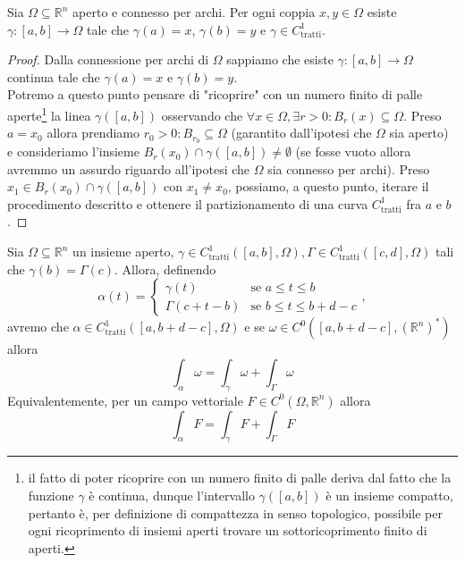 \begin{lemma}
	Sia $\Omega \subseteq \mathbb{R}^n$ aperto e connesso per archi. Per ogni coppia $x, y \in \Omega$ esiste $\gamma:[a, b] \to \Omega$ tale che $\gamma(a) = x$, $\gamma(b)=y$ e $\gamma \in C^1_\text{tratti}$.
\end{lemma}
\begin{proof}
	Dalla connessione per archi di $\Omega$ sappiamo che esiste $\gamma: [a, b] \to \Omega$ continua tale che $\gamma(a) = x$ e $\gamma(b) = y$. \\
	Potremo a questo punto pensare di "ricoprire" con un numero finito di palle aperte\footnote{il fatto di poter ricoprire con un numero finito di palle deriva dal fatto che la funzione $\gamma$ è continua, dunque l'intervallo $\gamma([a, b])$ è un insieme compatto, pertanto è, per definizione di compattezza in senso topologico, possibile per ogni ricoprimento di insiemi aperti trovare un sottoricoprimento finito di aperti.} la linea $\gamma([a, b])$ osservando che $\forall x \in \Omega, \exists r > 0: B_r(x) \subseteq \Omega$. Preso $a = x_0$ allora prendiamo $r_0 > 0: B_{r_0} \subseteq \Omega$ (garantito dall'ipotesi che $\Omega$ sia aperto) e consideriamo l'insieme
	$B_r(x_0) \cap \gamma([a, b]) \neq \emptyset$ (se fosse vuoto allora avremmo un assurdo riguardo all'ipotesi che $\Omega$ sia connesso per archi). Preso $x_1 \in B_r(x_0) \cap \gamma([a, b])$ con $x_1 \neq x_0$, possiamo, a questo punto, iterare il procedimento descritto e ottenere il partizionamento di una curva $C^1_\text{tratti}$ fra $a$ e $b$.
\end{proof}
\begin{prop}
Sia $\Omega \subseteq \mathbb{R}^n$ un insieme aperto, $\gamma \in C^1_{\text{tratti}}([a, b], \Omega), \Gamma \in C^1_{\text{tratti}}([c, d], \Omega)$ tali che $\gamma(b) = \Gamma(c)$. Allora, definendo 
$$
\alpha(t) = \begin{cases} \gamma(t) & \text{se } a \leq t \leq b \\ \Gamma(c + t - b) & \text{se } b \leq t \leq b + d -c \end{cases},
$$
avremo che $\alpha \in C^1_\text{tratti}([a, b + d -c], \Omega)$ e se $\omega \in C^0([a, b  + d - c], (\mathbb{R}^n)^*)$ allora
$$
\int_\alpha \omega = \int_\gamma \omega + \int_\Gamma \omega
$$
Equivalentemente, per un campo vettoriale $F \in C^0(\Omega, \mathbb{R}^n)$ allora
$$
\int_\alpha F = \int_\gamma F + \int_\Gamma F
$$
\label{prop:somma_curve}
\end{prop}
